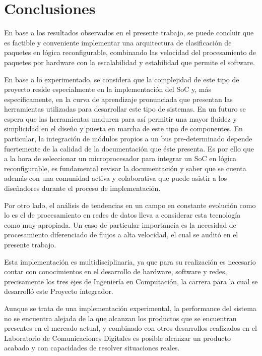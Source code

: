 \chapter{Conclusiones}


En base a los resultados observados en el presente trabajo, se puede concluir que es factible y conveniente implementar una arquitectura de clasificación de paquetes en lógica reconfigurable, combinando las velocidad del procesamiento de paquetes por hardware con la escalabilidad y estabilidad que permite el software. 

En base a lo experimentado, se considera que la complejidad de este tipo de proyecto reside especialmente en la implementación del SoC y, más específicamente, en la curva de aprendizaje pronunciada que presentan las herramientas utilizadas para desarrollar este tipo de sistemas. En un futuro se espera que las herramientas maduren para así permitir una mayor fluidez y simplicidad en el diseño y puesta en marcha de este tipo de componentes. En particular, la integración de módulos propios a un bus pre-determinado depende fuertemente de la calidad de la documentación que éste presenta. Es por ello que a la hora de seleccionar un microprocesador para integrar un SoC en lógica reconfigurable, es fundamental revisar la documentación y saber que se cuenta además con una comunidad activa y colaborativa que puede asistir a los diseñadores durante el proceso de implementación. 

Por otro lado, el análisis de tendencias en un campo en constante evolución como lo es el de procesamiento en redes de datos lleva a considerar esta tecnología como muy apropiada. Un caso de particular importancia es la necesidad de procesamiento diferenciado de flujos a alta velocidad, el cual se auditó en el presente trabajo.

Esta implementación es multidisciplinaria, ya que para su realización es necesario contar con conocimientos en el desarrollo de hardware, software y  redes, precisamente los tres ejes de Ingeniería en Computación, la carrera para la cual se desarrolló este Proyecto integrador. 

Aunque se trata de una implementación experimental, la performance del sistema no se encuentra alejada de la que alcanzan los productos que se encuentran presentes en el mercado actual, y combinado con otros desarrollos realizados en el Laboratorio de Comunicaciones Digitales es posible alcanzar un producto acabado y con capacidades de resolver situaciones reales.

